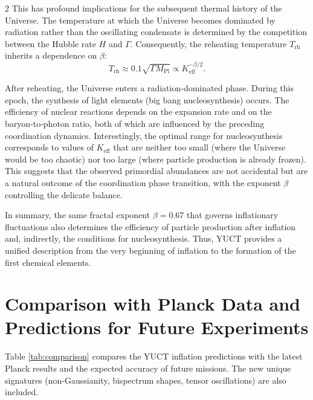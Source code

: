 \documentclass[12pt,a4paper]{article}
\newcommand{\Keff}{K_{\mathrm{eff}}}
\begin{document}
\begin{multicols}{2}
		This has profound implications for the subsequent thermal history of the Universe. The temperature at which the Universe becomes dominated by radiation rather than the oscillating condensate is determined by the competition between the Hubble rate \(H\) and \(\Gamma\). Consequently, the reheating temperature \(T_{\mathrm{rh}}\) inherits a dependence on \(\beta\):
		\begin{equation}
			T_{\mathrm{rh}} \approx 0.1 \sqrt{\Gamma M_{\mathrm{Pl}}} \propto \Keff^{-\beta/2}.
			\label{eq:trh}
		\end{equation}
		
		After reheating, the Universe enters a radiation‑dominated phase. During this epoch, the synthesis of light elements (big bang nucleosynthesis) occurs. The efficiency of nuclear reactions depends on the expansion rate and on the baryon‑to‑photon ratio, both of which are influenced by the preceding coordination dynamics. Interestingly, the optimal range for nucleosynthesis corresponds to values of \(\Keff\) that are neither too small (where the Universe would be too chaotic) nor too large (where particle production is already frozen). This suggests that the observed primordial abundances are not accidental but are a natural outcome of the coordination phase transition, with the exponent \(\beta\) controlling the delicate balance.
		
		In summary, the same fractal exponent \(\beta = 0.67\) that governs inflationary fluctuations also determines the efficiency of particle production after inflation and, indirectly, the conditions for nucleosynthesis. Thus, YUCT provides a unified description from the very beginning of inflation to the formation of the first chemical elements.
		
		\section{Comparison with Planck Data and Predictions for Future Experiments}
		\label{sec:comparison}
		
		Table \ref{tab:comparison} compares the YUCT inflation predictions with the latest Planck results and the expected accuracy of future missions. The new unique signatures (non‑Gaussianity, bispectrum shapes, tensor oscillations) are also included.
		
	\end{multicols}
	
\end{document}
